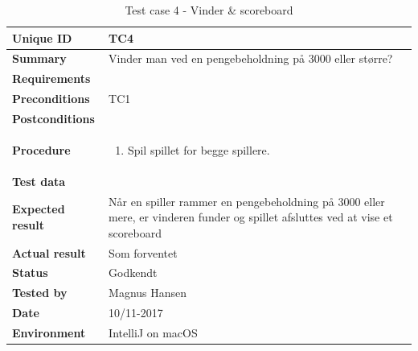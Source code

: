 \begin{table}[H]
    \begin{center}
        \begin{tabular}{|l|p{8cm}|}
            \hline
            \textbf{Unique ID} & TC4 \\
            \hline
            \textbf{Summary} & Vinder man ved en pengebeholdning på 3000 eller større? \\
            \hline
            \textbf{Requirements} & \\
            \hline
            \textbf{Preconditions} & TC1 \\
            \hline
            \textbf{Postconditions} & \\
            \hline
            \textbf{Procedure} & \begin{enumerate}
                \setlength\itemsep{0ex}
                \item Spil spillet for begge spillere.
            \end{enumerate} \\
            \hline
            \textbf{Test data} & \\
            \hline
            \textbf{Expected result} & Når en spiller rammer en pengebeholdning på 3000 eller mere, er vinderen funder og spillet afsluttes ved at vise et scoreboard \\
            \hline
            \textbf{Actual result} & Som forventet \\
            \hline
            \textbf{Status} & Godkendt \\
            \hline
            \textbf{Tested by} & Magnus Hansen \\
            \hline
            \textbf{Date} & 10/11-2017 \\
            \hline
            \textbf{Environment} & IntelliJ on macOS \\
            \hline
        \end{tabular}
    \end{center}
    \caption{Test case 4 - Vinder \& scoreboard}
    \label{tc:4}
\end{table}
